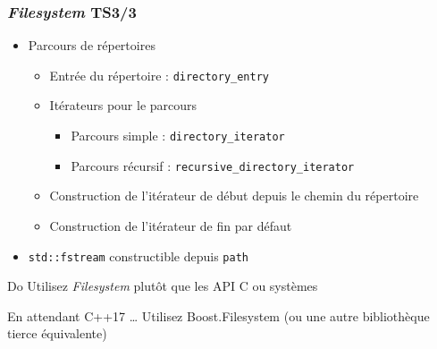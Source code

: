 \documentclass[C++.tex]{subfiles}
\begin{document}
\begin{frame}[fragile]
	\frametitle{\textit{Filesystem} TS\titlehfill{}3/3}
	\begin{itemize}
		\item Parcours de répertoires
		\begin{itemize}
			\item Entrée du répertoire : \lstinline|directory_entry|
			\item Itérateurs pour le parcours
			\begin{itemize}
				\item Parcours simple : \lstinline|directory_iterator|
				\item Parcours récursif : \lstinline|recursive_directory_iterator|
			\end{itemize}
			\item Construction de l'itérateur de début depuis le chemin du répertoire
			\item Construction de l'itérateur de fin par défaut
		\end{itemize}
		\item \lstinline|std::fstream| constructible depuis \lstinline|path|
	\end{itemize}

	\begin{exampleblock}{Do}
		Utilisez \textit{Filesystem} plutôt que les API C ou systèmes
	\end{exampleblock}

	\begin{block}{En attendant C++17 \ldots}
		Utilisez Boost.Filesystem (ou une autre bibliothèque tierce équivalente)

	\end{block}
\end{frame}
\end{document}
